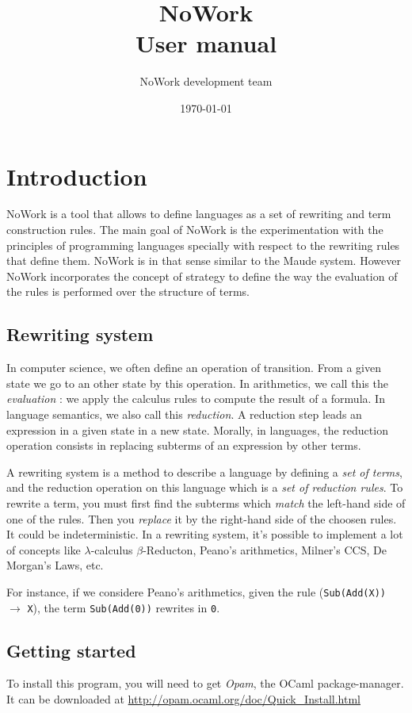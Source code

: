 \documentclass[12pt,a4paper]{article}
\title{NoWork\\
User manual}
\author{NoWork development team\\[2em]}
\date\today
\begin{document}
\maketitle


\section{Introduction}
NoWork is a tool that allows to define languages as a set of
rewriting and term construction rules. The main goal of NoWork
is the experimentation with the principles of programming languages
specially with respect to the rewriting rules that define them.
NoWork is in that sense similar to the Maude system. However NoWork
incorporates the concept of strategy to define the way the
evaluation of the rules is performed over the structure of terms.

\subsection{Rewriting system}
In computer science, we often define an operation of transition. From a
given state we go to an other state by this operation. In arithmetics,
we call this the \emph{evaluation} : we apply the calculus rules to
compute the result of a formula. In language semantics, we also call
this \emph{reduction}. A reduction step leads an expression in a given
state in a new state. Morally, in languages, the reduction operation
consists in replacing subterms of an expression by other terms.

A rewriting system is a method to describe a language by defining a
\emph{set of terms}, and the reduction operation on this language which
is a \emph{set of reduction rules}. 
To rewrite a term, you must first find the subterms which \emph{match} the left-hand side of one of the rules. Then you \emph{replace} it by the right-hand side of the choosen rules. It
could be indeterministic. In a rewriting system, it's possible to implement a lot of concepts like
$\lambda$-calculus $\beta$-Reducton, Peano's arithmetics, Milner's CCS,
De Morgan's Laws, etc. 

For instance, if we considere Peano's arithmetics, 
given the rule (\texttt{Sub(Add(X))} $\rightarrow$ \texttt{X}),
the term \texttt{Sub(Add(0))} rewrites in \texttt{0}.

\subsection{Getting started}
To install this program, you will need to get \emph{Opam}, the OCaml package-manager.
It can be downloaded at \url{http://opam.ocaml.org/doc/Quick_Install.html}
\end{document}
